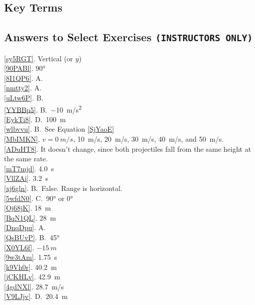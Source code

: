 \documentclass[main-physics.tex]{subfiles}
\begin{document}
\clearpage

\subsection{Key Terms}

\printnoidxglossaries


\clearpage

\subsection{Answers to Select Exercises \texttt{(INSTRUCTORS ONLY)}}
\ref{sy5RGT}. Vertical (or $y$)\\
\ref{90PABl}. \ang{90}\\
\ref{8I1QP6}. A.\\
\ref{nmtty2}. A. \\
\ref{uLtw6P}. B.\\
\ref{YYBBp5}. B.~\SI{-10}{m/s^2}\\
\ref{EykTi8}. D.~\SI{100}{m}\\
\ref{wlbvvu}. B.~See Equation \eqref{SjYaoE}\\
\ref{MbIMKN}. $v = \SI{0}{m/s}$, \SI{10}{m/s}, \SI{20}{m/s}, \SI{30}{m/s}, \SI{40}{m/s}, and \SI{50}{m/s}.\\
\ref{ADuHT8}. It doesn't change, since both projectiles fall from the same height at the same rate.\\
\ref{mT7mjd}. \SI{4.0}{s}\\
\ref{VllZAi}. \SI{3.2}{s}\\
\ref{xj6gln}. B.~False. Range is horizontal.\\
\ref{5wfdN0}. C.~\ang{90} or \ang{0}\\
\ref{Oj68jK}. \SI{18}{m}\\
\ref{BqN1QL}. \SI{28}{m}\\
\ref{DnqDpu}. A.\\
\ref{QsBUvP}. B.~\ang{45}\\
\ref{X0YL6f}. $-\SI{15}{m}$\\
\ref{9w3tAm}. \SI{1.75}{s}\\
\ref{k9Vh0r}. \SI{40.2}{m}\\
\ref{jCKHLv}. \SI{42.9}{m}\\
\ref{4gdNXl}. \SI{28.7}{m/s}\\
\ref{V9LJjv}. D.~\SI{20.4}{m}\\
\end{document}
